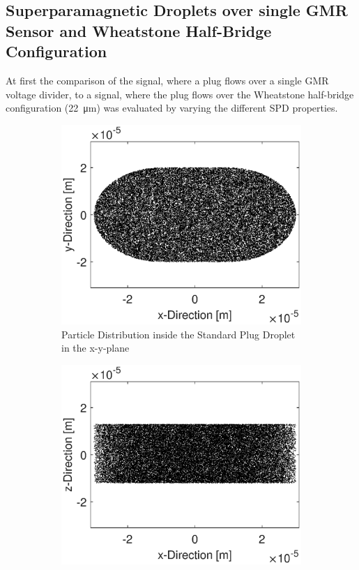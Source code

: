 \subsection{Superparamagnetic Droplets over single GMR Sensor and Wheatstone Half-Bridge Configuration}
\label{sec:plain_droplets_over_gmr}
At first the comparison of the signal, where a plug flows over a single GMR voltage divider, to a signal, where the plug flows over the Wheatstone half-bridge configuration (\SI{22}{\micro\meter}) was evaluated by varying the different SPD properties.
		\vspace{-5mm}
	\begin{figure}[h!]
	\begin{subfigure}[l]{0.49\linewidth} 
		\centering
		\includegraphics[clip,trim={0mm 0mm 10mm 0mm}, width=\linewidth]{Ressourcen/Results/Top}
		\caption{Particle Distribution inside the Standard Plug Droplet in the x-y-plane}
		\label{fig:sim:SPD:top}
	\end{subfigure}
	\hfil
	\begin{subfigure}[r]{0.49\linewidth} 
		\centering
		\includegraphics[clip,trim={0mm 0mm 10mm 0mm}, width=\linewidth]{Ressourcen/Results/Side}

\end{subfigure}
\end{figure}
